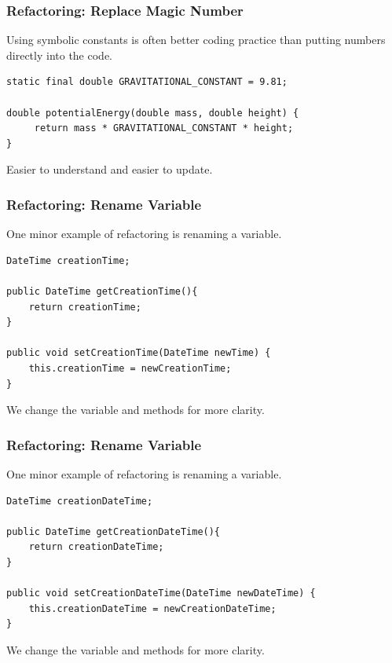 \begin{frame}[fragile]
\frametitle{Refactoring: Replace Magic Number}
\begin{changemargin}{1cm}
 Using symbolic constants is often better coding practice
than putting numbers directly into the code.

\begin{verbatim}
static final double GRAVITATIONAL_CONSTANT = 9.81;

double potentialEnergy(double mass, double height) {
     return mass * GRAVITATIONAL_CONSTANT * height;
}
\end{verbatim}

Easier to understand and easier to update.

\end{changemargin}
\end{frame}

\begin{frame}[fragile]
\frametitle{Refactoring: Rename Variable}
\begin{changemargin}{1cm}
One minor example of refactoring is renaming a variable.


\begin{verbatim}
DateTime creationTime;

public DateTime getCreationTime(){
    return creationTime;
}

public void setCreationTime(DateTime newTime) {
    this.creationTime = newCreationTime;
}

\end{verbatim}

We change the variable and methods for more clarity.

\end{changemargin}
\end{frame}

\begin{frame}[fragile]
\frametitle{Refactoring: Rename Variable}
\begin{changemargin}{1cm}
One minor example of refactoring is renaming a variable.


\begin{verbatim}
DateTime creationDateTime;

public DateTime getCreationDateTime(){
    return creationDateTime;
}

public void setCreationDateTime(DateTime newDateTime) {
    this.creationDateTime = newCreationDateTime;
}

\end{verbatim}

We change the variable and methods for more clarity.

\end{changemargin}
\end{frame}


